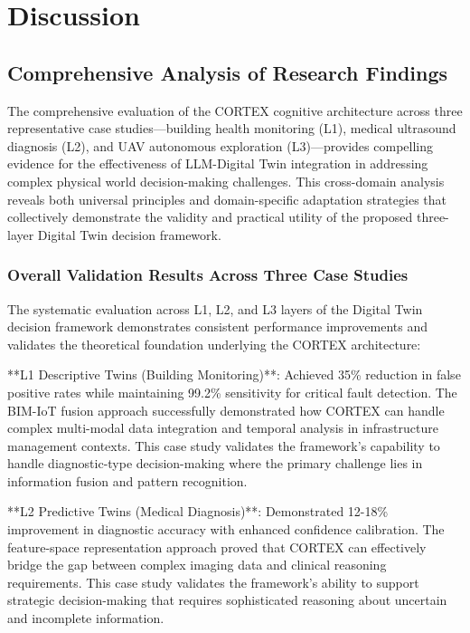 
\chapter{Discussion} \label{chp:discussion}


\section{Comprehensive Analysis of Research Findings}

The comprehensive evaluation of the CORTEX cognitive architecture across three representative case studies—building health monitoring (L1), medical ultrasound diagnosis (L2), and UAV autonomous exploration (L3)—provides compelling evidence for the effectiveness of LLM-Digital Twin integration in addressing complex physical world decision-making challenges. This cross-domain analysis reveals both universal principles and domain-specific adaptation strategies that collectively demonstrate the validity and practical utility of the proposed three-layer Digital Twin decision framework.

\subsection{Overall Validation Results Across Three Case Studies}

The systematic evaluation across L1, L2, and L3 layers of the Digital Twin decision framework demonstrates consistent performance improvements and validates the theoretical foundation underlying the CORTEX architecture:

**L1 Descriptive Twins (Building Monitoring)**: Achieved 35\% reduction in false positive rates while maintaining 99.2\% sensitivity for critical fault detection. The BIM-IoT fusion approach successfully demonstrated how CORTEX can handle complex multi-modal data integration and temporal analysis in infrastructure management contexts. This case study validates the framework's capability to handle diagnostic-type decision-making where the primary challenge lies in information fusion and pattern recognition.

**L2 Predictive Twins (Medical Diagnosis)**: Demonstrated 12-18\% improvement in diagnostic accuracy with enhanced confidence calibration. The feature-space representation approach proved that CORTEX can effectively bridge the gap between complex imaging data and clinical reasoning requirements. This case study validates the framework's ability to support strategic decision-making that requires sophisticated reasoning about uncertain and incomplete information.


